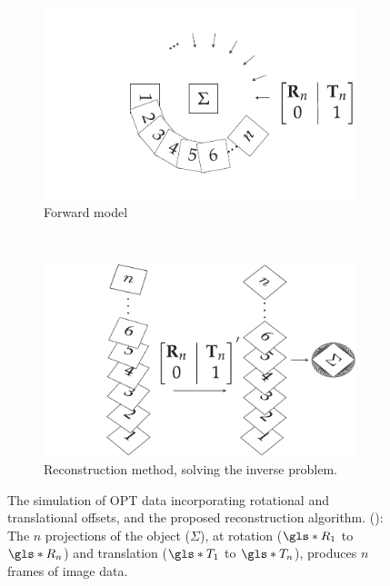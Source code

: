 \documentclass{osa-article}
\begin{document}
\begin{figure}
    \centering
    \begin{subfigure}[t]{\linewidth}
      \centering
      \includegraphics{./figures/flopt_algorithm_forward}
      \caption{Forward model}\label{fig:flopt_algorithm_forward}
  \end{subfigure}
  \\\vspace{\abovecaptionskip}
    \begin{subfigure}[t]{\linewidth}
      \centering
      \includegraphics{./figures/flopt_algorithm}
      \caption{Reconstruction method, solving the inverse problem.}\label{fig:flopt_algorithm_inverse}
    \end{subfigure}
    \caption[Simulation of OPT data incorporating rotational and translational offsets, and the proposed reconstruction algorithm]{
    The simulation of OPT data incorporating rotational and translational offsets, and the proposed reconstruction algorithm.
    (): The \(n\) projections of the object (\(\Sigma \)), at rotation (\(\gls*{R}_1\) to \(\gls*{R}_n\)) and translation (\(\gls*{T}_1\) to \(\gls*{T}_n\)), produces \(n\) frames of image data.
}
\end{figure}
\end{document}
